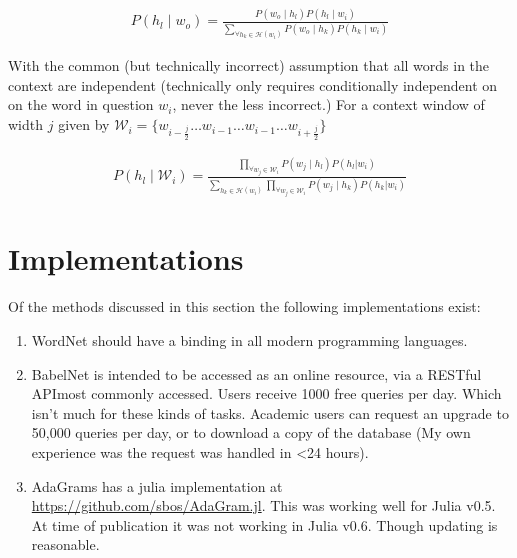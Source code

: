 \documentclass[12pt,parskip]{komatufte}
\begin{document}
\begin{align}
P(h_l \mid w_o) = \frac{P(w_o \mid h_l) P(h_l \mid w_i)}{\sum_{\forall h_k \in \mathcal{H}(w_i)} P(w_o \mid h_k) P(h_k \mid w_i)}
\end{align}

With the common (but technically incorrect) assumption that all words in the context are independent (technically only requires conditionally independent on on the word in question $w_i$, never the less incorrect.)
For a context window of width $j$ given by $\mathcal{W}_i = \lbrace w_{i-\frac{j}{2}} \ldots w_{i-1} \ldots w_{i-1} \dots w_{i+\frac{j}{2}} \rbrace$

\begin{align}
P(h_l \mid \mathcal{W}_i) = 
\frac{\prod_{\forall w_{j}\in \mathcal{W}_i} P(w_{j} \mid h_l) P(h_l | w_i)}{\sum_{h_k \in \mathcal{H}(w_i)} \prod_{\forall w_{j} \in \mathcal{W}_i} P(w_{j} \mid h_k) P(h_k | w_i)}
\end{align}


\section{Implementations}
Of the methods discussed in this section the following implementations exist:
\begin{enumerate}
	\item WordNet \parencite{tengi1998design} should have a binding in all modern programming languages.
	\item BabelNet \parencite{navigli2010babelnet} is intended to be accessed as an online resource, via a RESTful APImost commonly accessed. Users receive 1000 free queries per day. Which isn't much for these kinds of tasks. Academic users can request an upgrade to 50,000 queries per day, or to download a copy of the database (My own experience was the request was handled in <24 hours).
	\item AdaGrams \parencite{AdaGrams} has a julia implementation at \url{https://github.com/sbos/AdaGram.jl}. This was working well for Julia v0.5. At time of publication it was not working in Julia v0.6. Though updating is reasonable.
\end{enumerate}
\end{document}
